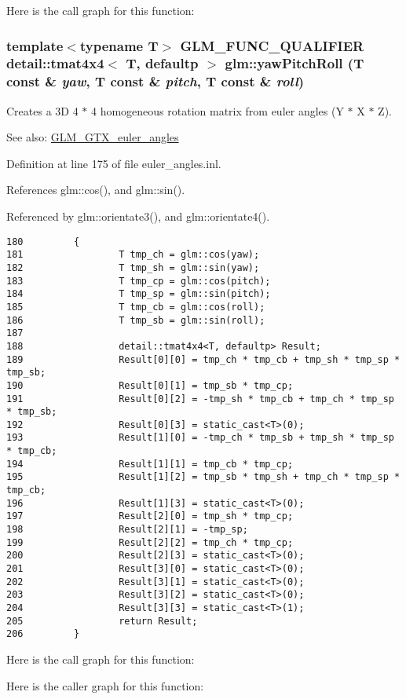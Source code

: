 Here is the call graph for this function:\hypertarget{group__gtx__euler__angles_ga254d26a7a42b65101f4eee88d5b153f}{
\subsubsection[yawPitchRoll]{\setlength{\rightskip}{0pt plus 5cm}template$<$typename T$>$ GLM\_\-FUNC\_\-QUALIFIER detail::tmat4x4$<$ T, defaultp $>$ glm::yawPitchRoll (T const \& {\em yaw}, \/  T const \& {\em pitch}, \/  T const \& {\em roll})}}
\label{group__gtx__euler__angles_ga254d26a7a42b65101f4eee88d5b153f}


Creates a 3D 4 $\ast$ 4 homogeneous rotation matrix from euler angles (Y $\ast$ X $\ast$ Z). \begin{Desc}
\item[See also:]\hyperlink{group__gtx__euler__angles}{GLM\_\-GTX\_\-euler\_\-angles} \end{Desc}


Definition at line 175 of file euler\_\-angles.inl.

References glm::cos(), and glm::sin().

Referenced by glm::orientate3(), and glm::orientate4().

\begin{Code}\begin{verbatim}180         {
181                 T tmp_ch = glm::cos(yaw);
182                 T tmp_sh = glm::sin(yaw);
183                 T tmp_cp = glm::cos(pitch);
184                 T tmp_sp = glm::sin(pitch);
185                 T tmp_cb = glm::cos(roll);
186                 T tmp_sb = glm::sin(roll);
187 
188                 detail::tmat4x4<T, defaultp> Result;
189                 Result[0][0] = tmp_ch * tmp_cb + tmp_sh * tmp_sp * tmp_sb;
190                 Result[0][1] = tmp_sb * tmp_cp;
191                 Result[0][2] = -tmp_sh * tmp_cb + tmp_ch * tmp_sp * tmp_sb;
192                 Result[0][3] = static_cast<T>(0);
193                 Result[1][0] = -tmp_ch * tmp_sb + tmp_sh * tmp_sp * tmp_cb;
194                 Result[1][1] = tmp_cb * tmp_cp;
195                 Result[1][2] = tmp_sb * tmp_sh + tmp_ch * tmp_sp * tmp_cb;
196                 Result[1][3] = static_cast<T>(0);
197                 Result[2][0] = tmp_sh * tmp_cp;
198                 Result[2][1] = -tmp_sp;
199                 Result[2][2] = tmp_ch * tmp_cp;
200                 Result[2][3] = static_cast<T>(0);
201                 Result[3][0] = static_cast<T>(0);
202                 Result[3][1] = static_cast<T>(0);
203                 Result[3][2] = static_cast<T>(0);
204                 Result[3][3] = static_cast<T>(1);
205                 return Result;
206         }
\end{verbatim}
\end{Code}




Here is the call graph for this function:

Here is the caller graph for this function:
